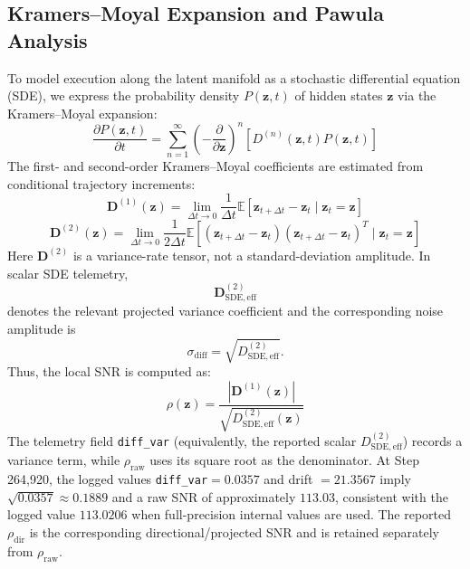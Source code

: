 \documentclass[11pt]{article}
\begin{document}
\subsection{Kramers--Moyal Expansion and Pawula Analysis}
To model execution along the latent manifold as a stochastic differential equation (SDE), we express the probability density $P(\mathbf{z}, t)$ of hidden states $\mathbf{z}$ via the Kramers--Moyal expansion:
\begin{equation}
\frac{\partial P(\mathbf{z},t)}{\partial t} = \sum_{n=1}^{\infty} \left(-\frac{\partial}{\partial \mathbf{z}}\right)^n \left[ D^{(n)}(\mathbf{z}, t) P(\mathbf{z},t) \right]
\end{equation}
The first- and second-order Kramers--Moyal coefficients are estimated from conditional trajectory increments:
\begin{equation}
\mathbf{D}^{(1)}(\mathbf{z}) = \lim_{\Delta t \to 0} \frac{1}{\Delta t} \mathbb{E}\left[\mathbf{z}_{t+\Delta t} - \mathbf{z}_t \mid \mathbf{z}_t = \mathbf{z}\right]
\end{equation}
\begin{equation}
\mathbf{D}^{(2)}(\mathbf{z}) = \lim_{\Delta t \to 0} \frac{1}{2\Delta t} \mathbb{E}\left[(\mathbf{z}_{t+\Delta t} - \mathbf{z}_t)(\mathbf{z}_{t+\Delta t} - \mathbf{z}_t)^T \mid \mathbf{z}_t = \mathbf{z}\right]
\end{equation}
Here $\mathbf{D}^{(2)}$ is a variance-rate tensor, not a standard-deviation amplitude. In scalar SDE telemetry,
\begin{equation}
\mathbf{D}^{(2)}_{\mathrm{SDE,eff}}
\end{equation}
denotes the relevant projected variance coefficient and the corresponding noise amplitude is
\begin{equation}
\sigma_{\mathrm{diff}} = \sqrt{D^{(2)}_{\mathrm{SDE,eff}}}.
\end{equation}
Thus, the local SNR is computed as:
\begin{equation}
\rho(\mathbf{z}) = \frac{|\mathbf{D}^{(1)}(\mathbf{z})|}{\sqrt{D^{(2)}_{\mathrm{SDE,eff}}(\mathbf{z})}}
\end{equation}
The telemetry field \texttt{diff\_var} (equivalently, the reported scalar $D^{(2)}_{\mathrm{SDE,eff}}$) records a variance term, while $\rho_{\mathrm{raw}}$ uses its square root as the denominator. At Step 264,920, the logged values \texttt{diff\_var}$=0.0357$ and drift $=21.3567$ imply $\sqrt{0.0357}\approx 0.1889$ and a raw SNR of approximately $113.03$, consistent with the logged value $113.0206$ when full-precision internal values are used. The reported $\rho_{\mathrm{dir}}$ is the corresponding directional/projected SNR and is retained separately from $\rho_{\mathrm{raw}}$.
\end{document}
